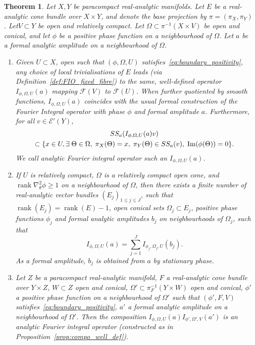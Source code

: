 \documentclass[10pt]{amsart}
\newtheorem{theo}{Theorem}[section]
\theoremstyle{definition}\newtheorem{defi}[theo]{Definition}\newtheorem{rema}[theo]{Remark}\newtheorem{exam}[theo]{Example}\newtheorem{exem}[theo]{Example}\newtheorem{nota}[theo]{Notation}
\DeclareMathOperator{\im}{Im}
\DeclareMathOperator{\rank}{rank}
\newcommand{\clE}{\mathcal{E}}
\newcommand{\clF}{\mathcal{F}}
\newcommand\1{\mathds{1}}
\let\oldexists\exists
\renewcommand*{\exists}{\mathrel{\oldexists}}
\let\originalleft\left
\let\originalright\right
\renewcommand{\left}{\mathopen{}\mathclose\bgroup\originalleft}
\renewcommand{\right}{\aftergroup\egroup\originalright}
\begin{document}
\begin{theo}\label{prop:FIOs}
Let $X,Y$ be paracompact real-analytic manifolds. Let $E$ be a real-analytic cone bundle over $X\times Y$, and denote the base projection by $\pi=(\pi_X,\pi_Y)$. Let$V\subset Y$ be open and relatively compact. Let $\Omega\subset \pi^{-1}(X\times V)$ be open and conical, and let $\phi$ be a positive phase function on a neighbourhood of $\Omega$. Let $a$ be a formal analytic amplitude on a neighbourhood of $\Omega$.
\begin{enumerate}
\item Given $U\subset X$, open such that $(\phi,\Omega,U)$ satisfies~\eqref{eq:boundary_positivity}, any choice of local trivialisations of $E$ leads (via Definition~\ref{def:FIO_fixed_fibre}) to the same, well-defined operator $I_{\phi,\Omega,U}(a)$ mapping $\clF(V)$ to $\clF(U)$. When further quotiented by smooth functions, $I_{\phi,\Omega,U}(a)$ coincides with the usual formal construction of the Fourier {Integral} operator with phase $\phi$ and formal amplitude $a$. Furthermore, for all $v\in
\clE'(Y)$,
\begin{multline*}
SS_a(I_{\phi,\Omega,U}(a)v)\\
\subset \left\{x\in U, \exists \Theta \in \Omega,\;
\pi_X (\Theta)=x, \;\pi_Y(\Theta)\in SS_a(v),\; \im(\phi(\Theta))=0\right\}.
\end{multline*}
We call \emph{analytic Fourier integral operator} such an $I_{\phi,\Omega,U}(a)$.

\item If $U$ is relatively compact, $\Omega$ is a relatively compact open cone, and\linebreak ${\rank \nabla^2_{\theta}\phi\geq 1}$ on a neighbourhood of $\Omega$, then there exists a finite number of real-analytic vector bundles $(E_j)_{1\leq j\leq J}$, such that $\rank(E_j)=\rank(E)-1$, open conical sets $\Omega_j\subset E_j$, positive phase functions $\phi_j$ and formal analytic amplitudes $b_j$ on neighbourhoods of $\Omega_j$, such that
\[
I_{\phi,\Omega,U}(a)=\sum_{j=1}^JI_{\phi_j,\Omega_j,U}(b_j).
\]
As a formal amplitude, $b_j$ is obtained from $a$ by stationary phase.

\item Let $Z$ be a paracompact real-analytic manifold, $F$ a real-analytic cone bundle over $Y\times Z$, $W\subset Z$ open and conical, $\Omega'\subset \pi_F^{-1}(Y\times W)$ open and conical, $\phi'$ a positive phase function on a neighbourhood of $\Omega'$ such that $(\phi',F,V)$ satisfies~\eqref{eq:boundary_positivity}, $a'$ a formal analytic amplitude on a neighbourhood of $\Omega'$. Then the composition $I_{\phi,\Omega,U}(a)I_{\phi',\Omega',V}(a')$ is an analytic Fourier integral operator (constructed as in Proposition~\ref{prop:compo_well_def}).
\end{enumerate}
\end{theo}
\end{document}
